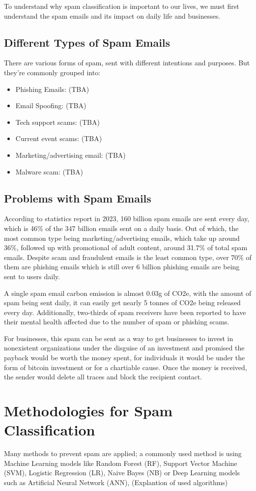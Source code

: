 To understand why spam classification is important to our lives, we must first understand the spam emails and its impact on daily life and businesses.
\subsection{Different Types of Spam Emails}
\label{subsec:different-types-of-spam-emails}

There are various forms of spam, sent with different intentions and purposes.
But they're commonly grouped into:

\begin{itemize}
    \item Phishing Emails: (TBA)
    \item Email Spoofing: (TBA)
    \item Tech support scams: (TBA)
    \item Current event scams: (TBA)
    \item Marketing/advertising email: (TBA)
    \item Malware scam: (TBA)
\end{itemize}

\subsection{Problems with Spam Emails}
\label{subsec:problems-with-spam-emails}

According to statistics report in 2023, 160 billion spam emails are sent every day, which is 46\% of the 347 billion emails sent on a daily basis.
Out of which, the most common type being marketing/advertising emails, which take up around 36\%, followed up with promotional of adult content, around 31.7\% of total spam emails. Despite scam and fraudulent emails is the least common type, over 70\% of them are phishing emails which is still over 6 billion phishing emails are being sent to users daily.

A single spam email carbon emission is almost 0.03g of CO2e, with the amount of spam being sent daily, it can easily get nearly 5 tonnes of CO2e being released every day.
Additionally, two-thirds of spam receivers have been reported to have their mental health affected due to the number of spam or phishing scams.

For businesses, this spam can be sent as a way to get businesses to invest in nonexistent organizations under the disguise of an investment and promised the payback would be worth the money spent, for individuals it would be under the form of bitcoin investment or for a chartiable cause.
Once the money is received, the sender would delete all traces and block the recipient contact.

\section{Methodologies for Spam Classification}
\label{sec:methodologies-for-spam-classification}

Many methods to prevent spam are applied; a commonly used method is using Machine Learning models like Random Forest (RF), Support Vector Machine (SVM), Logistic Regression (LR), Naive Bayes (NB) or Deep Learning models such as Artificial Neural Network (ANN),
(Explantion of used algorithms)